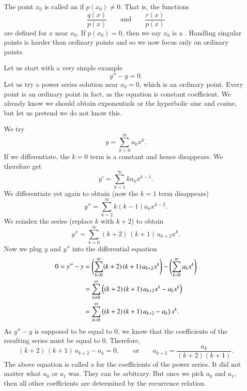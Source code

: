 \documentclass[12pt]{book}
\begin{document}
The point $x_0$ is called an \emph{}
if $p(x_0) \not= 0$.  That is, the functions
\begin{equation*}
\frac{q(x)}{p(x)} \qquad \text{and} \qquad \frac{r(x)}{p(x)}
\end{equation*}
are defined for $x$ near $x_0$.  If $p(x_0) = 0$, then we say $x_0$
is a \emph{}.  Handling singular points is
harder than ordinary points and so we now focus only on ordinary points.

\begin{example}
Let us start with a very simple example
\begin{equation*}
y'' - y = 0 .
\end{equation*}
Let us try a power series solution near $x_0 = 0$,
which is an ordinary point.  Every point is an ordinary
point in fact, as the equation is constant coefficient.  We already know
we should obtain exponentials or the hyperbolic sine and cosine,
but let us pretend we do not know this.

We try
\begin{equation*}
y = \sum_{k=0}^\infty a_k x^k .
\end{equation*}
If we differentiate, the $k=0$ term is a constant and hence disappears.
We therefore get
\begin{equation*}
y' = \sum_{k=1}^\infty k a_k x^{k-1} .
\end{equation*}
We differentiate yet again to obtain (now the $k=1$ term disappears)
\begin{equation*}
y'' = \sum_{k=2}^\infty k(k-1) a_k x^{k-2} .
\end{equation*}
We reindex the series (replace $k$ with $k+2$) to obtain
\begin{equation*}
y'' = \sum_{k=0}^\infty (k+2)\,(k+1) \, a_{k+2} x^k .
\end{equation*}
Now we plug $y$ and $y''$ into the differential equation
\begin{equation*}
\begin{split}
0 = y''-y & = 
\Biggl( \sum_{k=0}^\infty (k+2)\,(k+1) \, a_{k+2} x^k  \Biggr)
-
\Biggl( \sum_{k=0}^\infty a_k x^k \Biggr)
\\
& =
\sum_{k=0}^\infty \,\Bigl( (k+2)\,(k+1) \, a_{k+2} x^k 
-
a_k x^k \Bigr)
\\
& =
\sum_{k=0}^\infty \,\bigl( (k+2)\,(k+1) \,a_{k+2} - a_k \bigr) \, x^k  .
\end{split}
\end{equation*}
As $y'' - y$ is supposed to be equal to 0, we know that the
coefficients of the resulting series must be equal to 0.  Therefore,
\begin{equation*}
(k+2)\,(k+1) \,a_{k+2} - a_k = 0 ,
\qquad
\text{or}
\qquad
a_{k+2} = \frac{a_k}{(k+2)(k+1)} .
\end{equation*}
The above equation is called a \emph{}
for the coefficients of the power series.
It did not matter what $a_0$ or $a_1$ was.  They can be arbitrary.
But once we pick $a_0$ and $a_1$, then all other coefficients are
determined by the recurrence relation.


\end{example}
\end{document}
